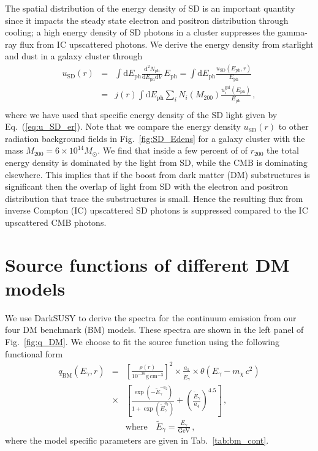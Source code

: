 \documentclass[10pt,aps,pra,reprint,amsmath,amsfonts,amssymb,showpacs,nofootinbib,floatfix]{revtex4-1}
\newcommand{\rmn}{\mathrm}
\newcommand{\ph}{\rmn{ph}}
\newcommand{\eph}{E_\ph}
\newcommand{\gal}{\rmn{gal}}
\newcommand{\sd}{\rmn{SD}}
\newcommand{\msun}{M_\odot}
\newcommand{\cm}{\rmn{cm}}
\newcommand{\egt}{\tilde{E}_\gamma}
\newcommand{\gev}{\rmn{GeV}}
\newcommand{\dd}{\rmn{d}}
\newcommand{\rvir}{r_{200}}
\newcommand{\mvir}{M_{200}}
\newcommand{\eg}{E_\gamma}
\begin{document}
The spatial distribution of the energy density of SD is an important
quantity since it impacts the steady state electron and positron
distribution through cooling; a high energy density of SD photons in
a cluster suppresses the gamma-ray flux from IC upscattered
photons. We derive the energy density from starlight and dust in a
galaxy cluster through
\begin{eqnarray}
\label{eq:u_SD_r}
u_\sd(r) &=& \int \dd \eph \frac{\dd^2 N_\ph}{\dd \eph \dd V}\,\eph
=\int \dd \eph \frac{u_\sd(\eph, r)}{\eph}
\nonumber \\
&=&  j(r)  \int \dd \eph \sum_i 
N_i(\mvir) \frac{u_i^\gal(\eph)}{\eph}\,, \nonumber \\
\end{eqnarray}
where we have used that specific energy density of the SD light given
by Eq.~(\ref{eq:u_SD_er}). Note that we compare the energy density
$u_\sd(r)$ to other radiation background fields in
Fig.~\ref{fig:SD_Edens} for a galaxy cluster with the mass
$\mvir=6\times10^{14}\msun$. We find that inside a few percent of of
$\rvir$ the total energy density is dominated by the light from SD,
while the CMB is dominating elsewhere. This implies that if the boost
from dark matter (DM) substructures is significant then the overlap of
light from SD with the electron and positron distribution that trace
the substructures is small. Hence the resulting flux from inverse
Compton (IC) upscattered SD photons is suppressed compared to the IC
upscattered CMB photons.


\section{Source functions of different DM models}
We use {\sc DarkSUSY} to derive the spectra for the continuum emission
from our four DM benchmark (BM) models. These spectra are shown in the
left panel of Fig.~\ref{fig:q_DM}. We choose to fit the source
function using the following functional form
\begin{eqnarray}
q_\rmn{BM} (\eg,r)&=&\left[\frac{\rho(r)}{10^{-29}\rmn{g}\,\cm^{-3}}\right]^2
\times\frac{a_1}{\egt}\times\theta(\eg-m_\chi\,c^2)\nonumber\\
&\times&\left[\frac{\exp\left(-\egt^{-a_2}\right)}{1+\exp\left(\egt^{a_3}\right)}
+\left(\frac{\egt}{a_4}\right)^{4.5}\right]\,, \nonumber\\
&&\rmn{where}\quad \egt = \frac{\eg}{\gev}\,,
 \label{eq:bm_cont}
\end{eqnarray}
where the model specific parameters are given in
Tab.~\ref{tab:bm_cont}.
\end{document}
